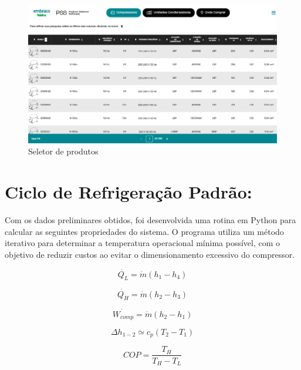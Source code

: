 \begin{figure}
    \centering
    \includegraphics[width=0.8\linewidth]{Imagens/Desenvolvimento/PSS-embraco.png}
    \caption{Seletor de produtos}
    \label{fig:seletor de produtos}
\end{figure}


\newpage

\section{Ciclo de Refrigeração Padrão:}

Com os dados preliminares obtidos, foi desenvolvida uma rotina em Python para calcular as seguintes propriedades do sistema. O programa utiliza um método iterativo para determinar a temperatura operacional mínima possível, com o objetivo de reduzir custos ao evitar o dimensionamento excessivo do compressor.

\begin{equation}
    \dot{Q_L} = \dot{m}(h_1-h_4)
    \label{QL}
\end{equation}

\begin{equation}
    \dot{Q_H} = \dot{m}(h_2-h_3)
    \label{QH}
\end{equation}

\begin{equation}
    \dot{W_{comp}} = \dot{m}(h_2-h_1)
    \label{W compressor}
\end{equation}

\begin{equation}
    \Delta h_{1-2} \simeq  c_p (T_2-T_1)
    \label{simplificacao entalpia}
\end{equation}

\begin{equation}
    COP = \frac{T_H}{T_H - T_L}
    \label{COP carnot}
\end{equation}



